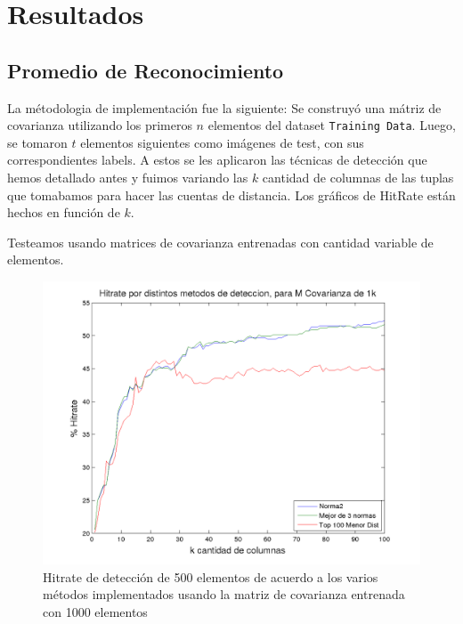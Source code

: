 \section{Resultados}


\subsection{Promedio de Reconocimiento}
La m\'etodologia de implementaci\'on fue la siguiente: Se construy\'o una
m\'atriz de covarianza utilizando los primeros $n$ elementos del dataset
\texttt{Training Data}. Luego, se tomaron $t$ elementos siguientes como im\'agenes
de test, con sus correspondientes labels. A estos se les aplicaron las t\'ecnicas
de detecci\'on que hemos detallado antes y fuimos variando las $k$ cantidad de
columnas de las tuplas que tomabamos para hacer las cuentas de distancia.
Los gr\'aficos de HitRate est\'an hechos en funci\'on de $k$.

Testeamos usando matrices de covarianza entrenadas con cantidad variable de elementos.
\def \hrwidth {500pt}

\begin{figure}[H]
\begin {center}
\includegraphics[width=\hrwidth]{plots/hitrate-1kcv.png}
\end {center}
\caption{Hitrate de detecci\'on de 500 elementos de acuerdo a los varios m\'etodos implementados
usando la matriz de covarianza entrenada con 1000 elementos}
\label{fig:HR1kcv}
\end{figure}

